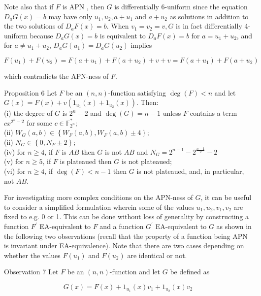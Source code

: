 \documentclass[10pt]{article}
\begin{document}
Note also that if $F$ is APN , then $G$ is differentially 6-uniform since the equation $D_{a} G(x)=b$ may have only $u_{1}, u_{2}, a+u_{1}$ and $a+u_{2}$ as solutions in addition to the two solutions of $D_{a} F(x)=b$. When $v_{1}=v_{2}=v, G$ is in fact differentially 4-uniform because $D_{a} G(x)=b$ is equivalent to $D_{a} F(x)=b$ for $a=u_{1}+u_{2}$, and for $a \neq u_{1}+u_{2}$, $D_{a} G\left(u_{1}\right)=D_{a} G\left(u_{2}\right)$ implies

$$
F\left(u_{1}\right)+F\left(u_{2}\right)=F\left(a+u_{1}\right)+F\left(a+u_{2}\right)+v+v=F\left(a+u_{1}\right)+F\left(a+u_{2}\right)
$$

which contradicts the APN-ness of $F$.

Proposition 6 Let $F$ be an $(n, n)$-function satisfying $\operatorname{deg}(F)<n$ and let $G(x)=F(x)+ v\left(1_{u_{1}}(x)+1_{u_{2}}(x)\right)$. Then:\\
(i) the degree of $G$ is $2^{n}-2$ and $\operatorname{deg}(G)=n-1$ unless $F$ contains a term $c x^{2^{n}-2}$ for some $c \in \mathbb{F}_{2^{n}}^{*}$;\\
(ii) $W_{G}(a, b) \in\left\{W_{F}(a, b), W_{F}(a, b) \pm 4\right\}$;\\
(ii) $N_{G} \in\left\{0, N_{F} \pm 2\right\}$;\\
(iv) for $n \geq 4$, if $F$ is $A B$ then $G$ is not $A B$ and $N_{G}=2^{n-1}-2^{\frac{n-1}{2}}-2$\\
(v) for $n \geq 5$, if $F$ is plateaued then $G$ is not plateaued;\\
(vi) for $n \geq 4$, if $\operatorname{deg}(F)<n-1$ then $G$ is not plateaued, and, in particular, not $A B$.

For investigating more complex conditions on the APN-ness of $G$, it can be useful to consider a simplified formulation wherein some of the values $u_{1}, u_{2}, v_{1}, v_{2}$ are fixed to e.g. 0 or 1. This can be done without loss of generality by constructing a function $F^{\prime}$ EA-equivalent to $F$ and a function $G^{\prime}$ EA-equivalent to $G$ as shown in the following two observations (recall that the property of a function being APN is invariant under EA-equivalence). Note that there are two cases depending on whether the values $F\left(u_{1}\right)$ and $F\left(u_{2}\right)$ are identical or not.

Observation 7 Let $F$ be an $(n, n)$-function and let $G$ be defined as

$$
G(x)=F(x)+1_{u_{1}}(x) v_{1}+1_{u_{2}}(x) v_{2}
$$
\end{document}
